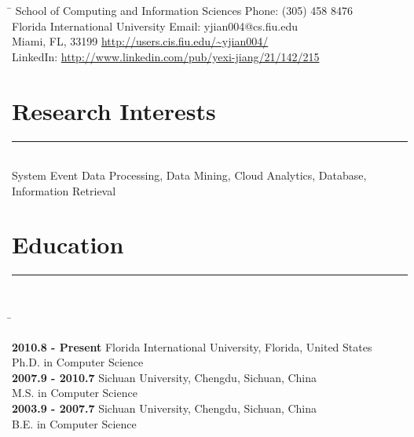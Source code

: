 \documentclass{res}
\begin{document}
\begin{resume}

\begin{center}
\end{center}

\begin{tabbing}
\hspace{3.3in}\= \kill
    School of Computing and Information Sciences  \>   Phone: (305) 458 8476\\
    Florida International University    \>   Email: yjian004@cs.fiu.edu\\
    Miami, FL, 33199    \>   \url{http://users.cis.fiu.edu/~yjian004/}\\
	LinkedIn: \url{http://www.linkedin.com/pub/yexi-jiang/21/142/215}
\end{tabbing}
\vspace{-15pt}


\section{\bfseries\Large Research Interests}
\hspace{-0.5in}\rule{16.8cm}{0.4pt}\\[0cm]
\noindent    System Event Data Processing, Data Mining, Cloud Analytics, Database, Information Retrieval

\section{\bfseries\Large Education}
\hspace{-0.5in}\rule{16.8cm}{0.4pt}\\[-0.9cm]
    \vspace{-5pt}
    \begin{tabbing}%
    \hspace{1.3in}\= \kill %

        {\bf 2010.8 - Present}  \> Florida International University, Florida, United States\\
                                \> Ph.D. in Computer Science\\[5pt]
        {\bf 2007.9 - 2010.7}   \> Sichuan University, Chengdu, Sichuan, China\\
                                \> M.S. in Computer Science\\[5pt]
        {\bf 2003.9 - 2007.7}   \> Sichuan University, Chengdu, Sichuan, China\\
								\> B.E. in Computer Science\\
    \end{tabbing}


\end{resume}
\end{document}
